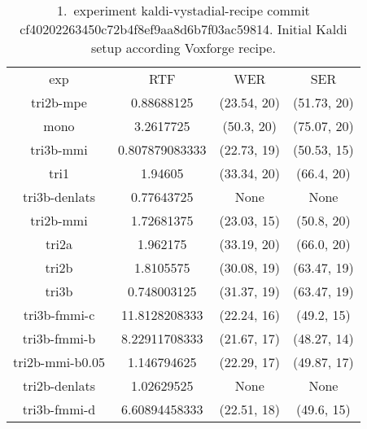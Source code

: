 \begin{table}[!htp]\centering\begin{tabular}{cccc}
exp             & \ac{RTF}       & \ac{WER}         & \ac{SER} \\
tri2b-mpe       & 0.88688125     & (23.54, 20) & (51.73, 20)\\
mono            & 3.2617725      & (50.3, 20)  & (75.07, 20)\\
tri3b-mmi       & 0.807879083333 & (22.73, 19) & (50.53, 15)\\
tri1            & 1.94605        & (33.34, 20) & (66.4, 20) \\
tri3b-denlats   & 0.77643725     & None        & None       \\
tri2b-mmi       & 1.72681375     & (23.03, 15) & (50.8, 20) \\
tri2a           & 1.962175       & (33.19, 20) & (66.0, 20) \\
tri2b           & 1.8105575      & (30.08, 19) & (63.47, 19)\\
tri3b           & 0.748003125    & (31.37, 19) & (63.47, 19)\\
tri3b-fmmi-c    & 11.8128208333  & (22.24, 16) & (49.2, 15) \\
tri3b-fmmi-b    & 8.22911708333  & (21.67, 17) & (48.27, 14)\\
tri2b-mmi-b0.05 & 1.146794625    & (22.29, 17) & (49.87, 17)\\
tri2b-denlats   & 1.02629525     & None        & None       \\
tri3b-fmmi-d    & 6.60894458333  & (22.51, 18) & (49.6, 15)
\end{tabular}
\caption{1.\ experiment kaldi-vystadial-recipe commit cf40202263450c72b4f8ef9aa8d6b7f03ac59814.
Initial Kaldi setup according Voxforge recipe.}
\end{table}  


